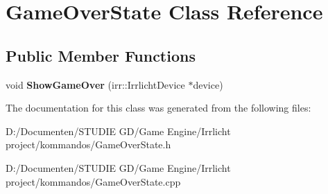 \hypertarget{class_game_over_state}{}\section{Game\+Over\+State Class Reference}
\label{class_game_over_state}
\subsection*{Public Member Functions}
\begin{DoxyCompactItemize}
\item 
\mbox{\label{class_game_over_state_a144dcad5d29cee7c76be7194407044d6}} 
void {\bfseries Show\+Game\+Over} (irr\+::\+Irrlicht\+Device $\ast$device)
\end{DoxyCompactItemize}


The documentation for this class was generated from the following files\+:\begin{DoxyCompactItemize}
\item 
D\+:/\+Documenten/\+S\+T\+U\+D\+I\+E G\+D/\+Game Engine/\+Irrlicht project/kommandos/Game\+Over\+State.\+h\item 
D\+:/\+Documenten/\+S\+T\+U\+D\+I\+E G\+D/\+Game Engine/\+Irrlicht project/kommandos/Game\+Over\+State.\+cpp\end{DoxyCompactItemize}
